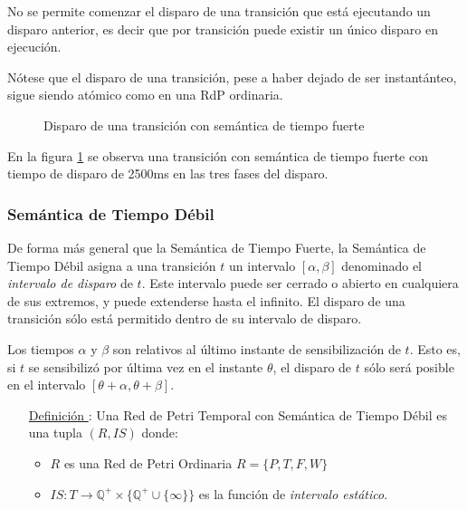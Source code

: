 No se permite comenzar el disparo de una transición que está ejecutando un
disparo anterior, es decir que por transición puede existir un único disparo en
ejecución.

Nótese que el disparo de una transición, pese a haber dejado de ser
instantánteo, sigue siendo atómico como en una RdP ordinaria.

\begin{figure}[h]
  \centering
  \caption{Disparo de una transición con semántica de tiempo fuerte}
  \label{fig:disparo_tiempo_fuerte}
\end{figure}

En la figura \ref{fig:disparo_tiempo_fuerte} se observa una transición con
semántica de tiempo fuerte con tiempo de disparo de 2500ms en las tres fases del
disparo.

\subsubsection{Semántica de Tiempo Débil}
\label{semantica_tiempo_debil}

De forma más general que la Semántica de Tiempo Fuerte, la Semántica de
Tiempo Débil asigna a una transición $t$ un intervalo $[\alpha, \beta]$
denominado el \textit{intervalo de disparo} de $t$. Este intervalo puede ser cerrado o
abierto en cualquiera de sus extremos, y puede extenderse hasta el infinito. El
disparo de una transición sólo está permitido dentro de su intervalo de disparo.

Los tiempos $\alpha$ y $\beta$ son relativos al último instante de
sensibilización de $t$.
Esto es, si $t$ se sensibilizó por última vez en el instante $\theta$, el
disparo de $t$ sólo será posible en el intervalo $[\theta + \alpha, \theta
+ \beta]$. \cite{PetriNetsFundamentals}

\begin{itemize}
  \item [\underline{Definición \thedefinitionsCounter}:] Una Red de Petri Temporal con Semántica de
  Tiempo Débil es una tupla $(R, IS)$ donde:
  \begin{itemize}
    \item $R$ es una Red de Petri Ordinaria $R = \{P, T, F, W \}$
    \item $IS: T \rightarrow \mathbb{Q^{+}} \times \{ \mathbb{Q^{+}} \cup \{
    \infty \} \}$ es la función de \textit{intervalo estático}.
  \end{itemize}
\end{itemize}

